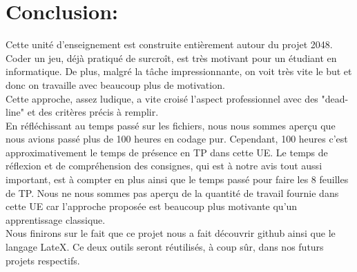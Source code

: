 \documentclass{report}
\begin{document}
\chapter{Conclusion:}
Cette unité d'enseignement est construite entièrement autour du projet 2048. Coder un jeu, déjà pratiqué de surcroît, est très motivant pour un étudiant en informatique. De plus, malgré la tâche impressionnante, on voit très vite le but et donc on travaille avec beaucoup plus de motivation.\\
Cette approche, assez ludique, a vite croisé l'aspect professionnel avec des "dead-line" et des critères précis à remplir.\\
En réfléchissant au temps passé sur les fichiers, nous nous sommes aperçu que nous avions passé plus de 100 heures en codage pur. Cependant, 100 heures c'est approximativement le temps de présence en TP dans cette UE. Le temps de réflexion et de compréhension des consignes, qui est à notre avis tout aussi important, est à compter en plus ainsi que le temps passé pour faire les 8 feuilles de TP. Nous ne nous sommes pas aperçu de la quantité de travail fournie dans cette UE car l'approche proposée est beaucoup plus motivante qu'un apprentissage classique.\\
Nous finirons sur le fait que ce projet nous a fait découvrir github ainsi que le langage LateX. Ce deux outils seront réutilisés, à coup sûr, dans nos futurs projets respectifs.
\end{document}
